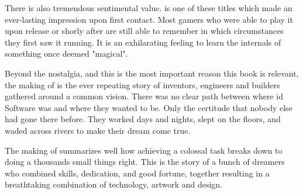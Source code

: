  \par
There is also tremendous sentimental value. \doom{} is one of these titles which made an ever-lasting impression upon first contact. Most gamers who were able to play it upon release or shorly after are still able to remember in which circumstances they first saw it running. It is an exhilarating feeling to learn the internals of something once deemed "magical".\\
\par


Beyond the nostalgia, and this is the most important reason this book is relevant, the making of \doom{} is the ever repeating story of inventors, engineers and builders gathered around a common vision. There was no clear path between where id Software was and where they wanted to be. Only the certitude that nobody else had gone there before. They worked days and nights, slept on the floors, and waded across rivers to make their dream come true.\\
\par
 The making of \doom{} summarizes well how achieving a colossal task breaks down to doing a thousands small things right. This is the story of a bunch of dreamers who combined skills, dedication, and good fortune, together resulting in a breathtaking combination of technology, artwork and design.\\
\par



